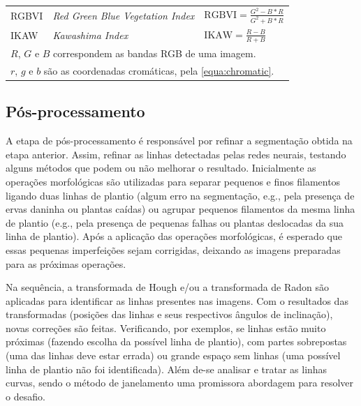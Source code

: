 \documentclass[12pt, a4paper, english, brazil]{article}
\begin{document}
\begin{table}[htb]
\begin{tabular}{@{}lll@{}}
        \multirow{2}{*}{RGBVI} & \multirow{2}{*}{\textit{Red Green Blue Vegetation Index}} & \multirow{2}{*}{$\displaystyle \text{RGBVI} = \frac{G^2 - B * R}{G^2 + B * R}$} \\
        & & \\ \midrule

        \multirow{2}{*}{IKAW} & \multirow{2}{*}{\textit{Kawashima Index}} & \multirow{2}{*}{$\displaystyle \text{IKAW} = \frac{R - B}{R + B}$} \\
        & & \\ \bottomrule

         \multicolumn{3}{l}{$R$, $G$ e $B$ correspondem as bandas RGB de uma imagem.} \\
         \multicolumn{3}{l}{$r$, $g$ e $b$ são as coordenadas cromáticas, pela \autoref{equa:chromatic}.} \\

    \end{tabular}
\end{table}

\subsection{Pós-processamento}

A etapa de pós-processamento é responsável por refinar a segmentação obtida na etapa anterior. Assim, refinar as linhas detectadas pelas redes neurais, testando alguns métodos que podem ou não melhorar o resultado. Inicialmente as operações morfológicas são utilizadas para separar pequenos e finos filamentos ligando duas linhas de plantio (algum erro na segmentação, e.g., pela presença de ervas daninha ou plantas caídas) ou agrupar pequenos filamentos da mesma linha de plantio (e.g., pela presença de pequenas falhas ou plantas deslocadas da sua linha de plantio). Após a aplicação das operações morfológicas, é esperado que essas pequenas imperfeições sejam corrigidas, deixando as imagens preparadas para as próximas operações.

Na sequência, a transformada de Hough e/ou a transformada de Radon são aplicadas para identificar as linhas presentes nas imagens. Com o resultados das transformadas (posições das linhas e seus respectivos ângulos de inclinação), novas correções são feitas. Verificando, por exemplos, se linhas estão muito próximas (fazendo escolha da possível linha de plantio), com partes sobrepostas (uma das linhas deve estar errada) ou grande espaço sem linhas (uma possível linha de plantio não foi identificada). Além de-se analisar e tratar as linhas curvas, sendo o método de janelamento uma promissora abordagem para resolver o desafio.
\end{document}
